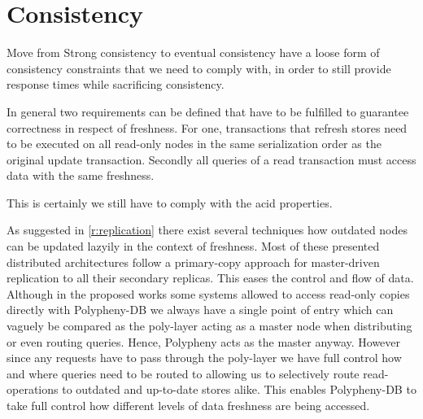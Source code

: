 



\section{Consistency}
\label{sec:consistency_concept}
Move from Strong consistency to eventual consistency 
have a loose form of consistency constraints that we need to comply with, in order to still provide response times while sacrificing consistency.

In general two requirements can be defined that have to be fulfilled to
guarantee correctness in respect of freshness. For one, transactions that refresh stores need to be executed on all read-only nodes in the same serialization order as the 
original update transaction. Secondly all queries of a read transaction must access data with the same freshness. 




This is certainly we still have to comply with the acid properties. 


As suggested in \ref{r:replication} there exist several techniques how outdated nodes can be updated lazyily in the context of freshness.
Most of these presented distributed architectures follow a primary-copy approach for master-driven replication to all their secondary replicas.
This eases the control and flow of data. Although in the proposed works some systems allowed to access read-only copies directly
with Polypheny-DB we always have a single point of entry which can vaguely be compared as the poly-layer acting as a master node
when distributing or even routing queries. Hence, Polypheny acts as the master anyway. However since any requests have to pass through the poly-layer
we have full control how and where queries need to be routed to allowing us to selectively route read-operations to outdated and up-to-date stores alike.
This enables Polypheny-DB to take full control how different levels of data freshness are being accessed.

